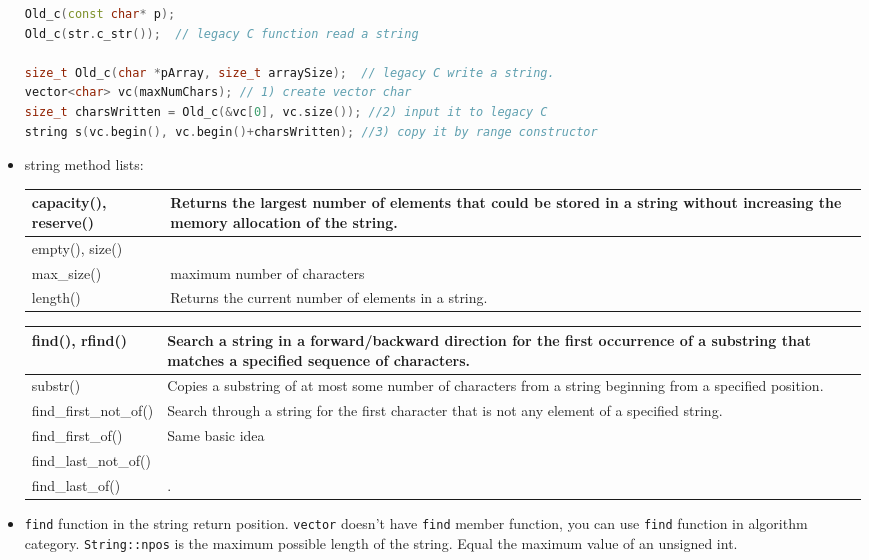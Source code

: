 \documentclass[a4paper,11pt,twoside]{book}
\newcommand{\tophline}{\hline }
\newcommand{\bottomhline}{\\ \hline }
\newcommand{\tophline}{ }
\newcommand{\bottomhline}{ }
\begin{document}
\begin{itemize}
\begin{lstlisting}[frame=single, language=c++]
Old_c(const char* p); 
Old_c(str.c_str());  // legacy C function read a string
	
size_t Old_c(char *pArray, size_t arraySize);  // legacy C write a string.
vector<char> vc(maxNumChars); // 1) create vector char
size_t charsWritten = Old_c(&vc[0], vc.size()); //2) input it to legacy C
string s(vc.begin(), vc.begin()+charsWritten); //3) copy it by range constructor
\end{lstlisting}
	
	\item string method lists:
	
	\begin{tabular}{| p{} |p{}|}
		\tophline
		capacity(), reserve() & Returns the largest number of elements that could be stored in a string without increasing the memory allocation of the string.\\
		\tophline
		empty(),  size()& \\
		\tophline
		max\_size() & maximum number of characters \\
		\tophline
		length() & Returns the current number of elements in a string.\bottomhline
		
	\end{tabular}
	
	\begin{tabular}{| p{} |p{}|}
		\tophline
		find(), rfind() & Search a string in a forward/backward direction for the first occurrence of a substring that matches a specified sequence of characters.\\
		\tophline
		substr() & Copies a substring of at most some number of characters from a string beginning from a specified position. \\
		
		\tophline
		find\_first\_not\_of()& Search through a string for the first character that is not any element of a specified string.\\
		\tophline
		find\_first\_of() & Same basic idea\\
		\tophline
		find\_last\_not\_of() & \\
		\tophline
		find\_last\_of() & .\bottomhline
	\end{tabular}
	
	\item \texttt{find} function in the string return position. \texttt{vector} doesn't have \texttt{find} member function, you can use \texttt{find} function in  algorithm category. \texttt{String::npos} is the maximum possible length of the string. Equal the maximum value of an unsigned int.
	

\end{itemize}
\end{document}
